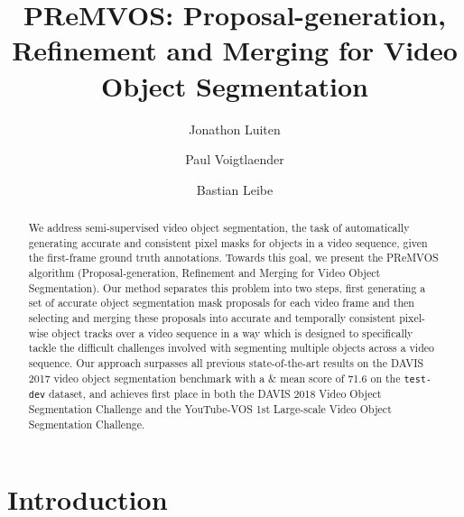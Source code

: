 \documentclass[runningheads]{llncs}
\begin{document}
\title{PReMVOS: Proposal-generation, Refinement and Merging for Video Object Segmentation}  



\author{Jonathon Luiten \and Paul Voigtlaender \and Bastian Leibe}






\maketitle

\begin{abstract}
We address semi-supervised video object segmentation, the task of automatically generating accurate and consistent pixel masks for objects in a video sequence, given the first-frame ground truth annotations. Towards this goal, we  present the PReMVOS algorithm (Proposal-generation, Refinement and Merging for Video Object Segmentation). Our method separates this problem into two steps, first generating a set of accurate object segmentation mask proposals for each video frame and then selecting and merging these proposals into accurate and temporally consistent pixel-wise object tracks over a video sequence in a way which is designed to specifically tackle the difficult challenges involved with segmenting multiple objects across a video sequence. Our approach surpasses all previous state-of-the-art results on the DAVIS 2017 video object segmentation benchmark with a \& mean score of 71.6 on the \texttt{test-dev} dataset, and achieves first place in both the DAVIS 2018 Video Object Segmentation Challenge and the YouTube-VOS 1st Large-scale Video Object Segmentation Challenge.

\end{abstract}


\section{Introduction}
\end{document}

